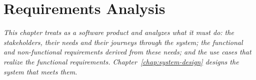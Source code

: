 \chapter{Requirements Analysis}
\label{chap:requirements}
\textit{This chapter treats \sysname{} as a software product and analyzes what it must do: the stakeholders, their needs and their journeys through the system; the functional and non-functional requirements derived from these needs; and the use cases that realize the functional requirements. Chapter~\ref{chap:system-design} designs the system that meets them.}






